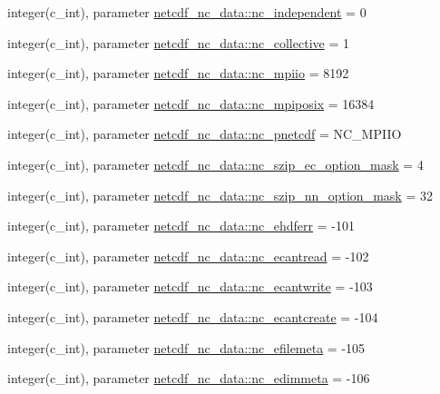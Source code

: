 \begin{DoxyCompactItemize}
\item 
integer(c\+\_\+int), parameter \hyperlink{namespacenetcdf__nc__data_afa082ef2e4964d0eab52a82d96737a43}{netcdf\+\_\+nc\+\_\+data\+::nc\+\_\+independent} = 0
\item 
integer(c\+\_\+int), parameter \hyperlink{namespacenetcdf__nc__data_aec06d12fbb07bf45435d9820501fc2cc}{netcdf\+\_\+nc\+\_\+data\+::nc\+\_\+collective} = 1
\item 
integer(c\+\_\+int), parameter \hyperlink{namespacenetcdf__nc__data_a24a00c693d9f358d39ea74ed945a8add}{netcdf\+\_\+nc\+\_\+data\+::nc\+\_\+mpiio} = 8192
\item 
integer(c\+\_\+int), parameter \hyperlink{namespacenetcdf__nc__data_ab68ea6219956d7c6855e01ac6587f91f}{netcdf\+\_\+nc\+\_\+data\+::nc\+\_\+mpiposix} = 16384
\item 
integer(c\+\_\+int), parameter \hyperlink{namespacenetcdf__nc__data_a942139d2e6086ea7b93c55f690440d91}{netcdf\+\_\+nc\+\_\+data\+::nc\+\_\+pnetcdf} = N\+C\+\_\+\+M\+P\+I\+IO
\item 
integer(c\+\_\+int), parameter \hyperlink{namespacenetcdf__nc__data_aca19d8ddf38493b2a61e0d746bd01534}{netcdf\+\_\+nc\+\_\+data\+::nc\+\_\+szip\+\_\+ec\+\_\+option\+\_\+mask} = 4
\item 
integer(c\+\_\+int), parameter \hyperlink{namespacenetcdf__nc__data_a6a769b2ec5c5877b73f7f2cbc79c184f}{netcdf\+\_\+nc\+\_\+data\+::nc\+\_\+szip\+\_\+nn\+\_\+option\+\_\+mask} = 32
\item 
integer(c\+\_\+int), parameter \hyperlink{namespacenetcdf__nc__data_a1169af4f3c40cf31b785e21f2dbd5ec0}{netcdf\+\_\+nc\+\_\+data\+::nc\+\_\+ehdferr} = -\/101
\item 
integer(c\+\_\+int), parameter \hyperlink{namespacenetcdf__nc__data_a7c09644694f0dbb0d805a8847d8ba892}{netcdf\+\_\+nc\+\_\+data\+::nc\+\_\+ecantread} = -\/102
\item 
integer(c\+\_\+int), parameter \hyperlink{namespacenetcdf__nc__data_a137d59869772609c6b055b4935e205b9}{netcdf\+\_\+nc\+\_\+data\+::nc\+\_\+ecantwrite} = -\/103
\item 
integer(c\+\_\+int), parameter \hyperlink{namespacenetcdf__nc__data_a4b769146020153d93441a502218706e0}{netcdf\+\_\+nc\+\_\+data\+::nc\+\_\+ecantcreate} = -\/104
\item 
integer(c\+\_\+int), parameter \hyperlink{namespacenetcdf__nc__data_af93ef78d159c77b159bc56f000e51824}{netcdf\+\_\+nc\+\_\+data\+::nc\+\_\+efilemeta} = -\/105
\item 
integer(c\+\_\+int), parameter \hyperlink{namespacenetcdf__nc__data_add520bc3a4ddd4262455c5ea1bf98f1e}{netcdf\+\_\+nc\+\_\+data\+::nc\+\_\+edimmeta} = -\/106

\end{DoxyCompactItemize}

